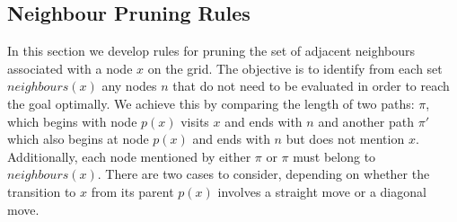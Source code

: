 \subsection{Neighbour Pruning Rules} 
\label{sec:pruning}

In this section we develop rules for pruning the set of adjacent neighbours
associated with a node $x$ on the grid.  The objective is to identify from each
set $neighbours(x)$ any nodes $n$ that do not need to be evaluated in order to
reach the goal optimally. We achieve this by comparing the length of two paths:
$\pi$, which begins with node $p(x)$ visits $x$ and ends with $n$ and another
path $\pi'$ which also begins at node $p(x)$ and ends with $n$ but does not 
mention $x$. 
Additionally, each node mentioned by either $\pi$ or $\pi$ must belong to 
$neighbours(x)$.
There are two cases to consider, depending on
whether the transition to $x$ from its parent $p(x)$ involves a straight move or
a diagonal move. 

